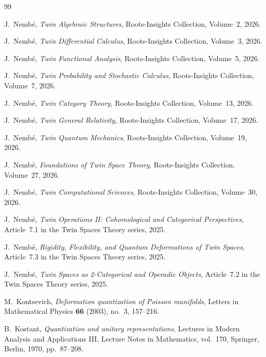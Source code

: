 \documentclass[11pt,a4paper,openany]{book}
\theoremstyle{plain}
\theoremstyle{definition}
\begin{document}
\begin{thebibliography}{99}

J.~Nemb\'e, \emph{Twin Algebraic Structures},
Roots-Insights Collection, Volume~2, 2026.

J.~Nemb\'e, \emph{Twin Differential Calculus},
Roots-Insights Collection, Volume~3, 2026.

J.~Nemb\'e, \emph{Twin Functional Analysis},
Roots-Insights Collection, Volume~5, 2026.

J.~Nemb\'e, \emph{Twin Probability and Stochastic Calculus},
Roots-Insights Collection, Volume~7, 2026.

J.~Nemb\'e, \emph{Twin Category Theory},
Roots-Insights Collection, Volume~13, 2026.

J.~Nemb\'e, \emph{Twin General Relativity},
Roots-Insights Collection, Volume~17, 2026.

J.~Nemb\'e, \emph{Twin Quantum Mechanics},
Roots-Insights Collection, Volume~19, 2026.

J.~Nemb\'e, \emph{Foundations of Twin Space Theory},
Roots-Insights Collection, Volume~27, 2026.

J.~Nemb\'e, \emph{Twin Computational Sciences},
Roots-Insights Collection, Volume~30, 2026.

J.~Nemb\'e, \emph{Twin Operations II: Cohomological and Categorical Perspectives},
Article~7.1 in the Twin Spaces Theory series, 2025.

J.~Nemb\'e, \emph{Rigidity, Flexibility, and Quantum Deformations of Twin Spaces},
Article~7.3 in the Twin Spaces Theory series, 2025.

J.~Nemb\'e, \emph{Twin Spaces as 2-Categorical and Operadic Objects},
Article~7.2 in the Twin Spaces Theory series, 2025.

M.~Kontsevich, \emph{Deformation quantization of Poisson manifolds}, Letters in Mathematical Physics \textbf{66} (2003), no.~3, 157--216.

B.~Kostant, \emph{Quantization and unitary representations}, Lectures in Modern Analysis and Applications III, Lecture Notes in Mathematics, vol.~170, Springer, Berlin, 1970, pp.~87--208.


\end{thebibliography}
\end{document}
